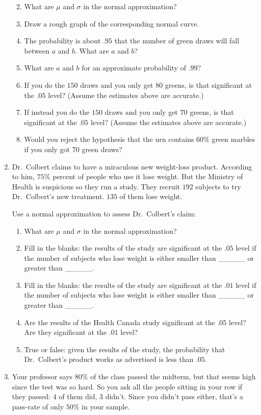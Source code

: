 \documentclass[justified]{tufte-book}
\providecommand{\tightlist}{%
  \setlength{\itemsep}{0pt}\setlength{\parskip}{0pt}}
\theoremstyle{definition}
\theoremstyle{definition}
\theoremstyle{definition}
\theoremstyle{remark}
\begin{document}
\begin{enumerate}
  \begin{enumerate}
  \def\labelenumii{\alph{enumii}.}
  \tightlist
  \item
    What are \(\mu\) and \(\sigma\) in the normal approximation?
  \item
    Draw a rough graph of the corresponding normal curve.
  \item
    The probability is about \(.95\) that the number of green draws will fall between \(a\) and \(b\). What are \(a\) and \(b\)?
  \item
    What are \(a\) and \(b\) for an approximate probability of \(.99\)?
  \item
    If you do the \(150\) draws and you only get \(80\) greens, is that significant at the \(.05\) level? (Assume the estimates above are accurate.)
  \item
    If instead you do the \(150\) draws and you only get \(70\) greens, is that significant at the \(.05\) level? (Assume the estimates above are accurate.)
  \item
    Would you reject the hypothesis that the urn contains \(60\%\) green marbles if you only got 70 green draws?
  \end{enumerate}
\item
  Dr.~Colbert claims to have a miraculous new weight-loss product. According to him, \(75\%\) percent of people who use it lose weight. But the Ministry of Health is suspicious so they run a study. They recruit \(192\) subjects to try Dr.~Colbert's new treatment. \(135\) of them lose weight.

  Use a normal approximation to assess Dr.~Colbert's claim:

  \begin{enumerate}
  \def\labelenumii{\alph{enumii}.}
  \tightlist
  \item
    What are \(\mu\) and \(\sigma\) in the normal approximation?
  \item
    Fill in the blanks: the results of the study are significant at the \(.05\) level if the number of subjects who lose weight is either smaller than \_\_\_\_\_ or greater than \_\_\_\_\_.
  \item
    Fill in the blanks: the results of the study are significant at the \(.01\) level if the number of subjects who lose weight is either smaller than \_\_\_\_\_ or greater than \_\_\_\_\_.
  \item
    Are the results of the Health Canada study significant at the \(.05\) level? Are they significant at the \(.01\) level?
  \item
    True or false: given the results of the study, the probability that Dr.~Colbert's product works as advertised is less than \(.05\).
  \end{enumerate}
\item
  Your professor says \(80\%\) of the class passed the midterm, but that seems high since the test was so hard. So you ask all the people sitting in your row if they passed: \(4\) of them did, \(3\) didn't. Since you didn't pass either, that's a pass-rate of only \(50\%\) in your sample.


\end{enumerate}
\end{document}

